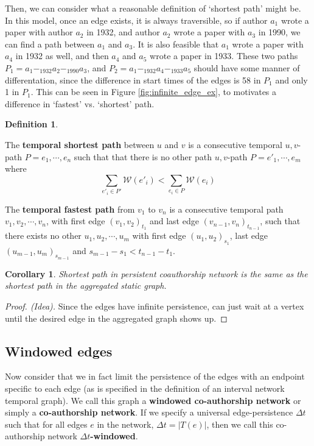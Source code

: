\documentclass{article}
\newtheorem{cor}[thm]{Corollary}
\theoremstyle{definition}
\newtheorem{defn}[thm]{Definition}
\numberwithin{thm}{subsection}
\newcommand{\W}{\mathcal{W}}
\begin{document}
Then, we can consider what a reasonable definition of `shortest path' might be.
In this model, once an edge exists, it is always traversible, so if author
$a_1$ wrote a paper with author $a_2$ in 1932, and author $a_2$ wrote a paper with
$a_3$ in 1990, we can find a path between $a_1$ and $a_3$.  It is also feasible
that $a_1$ wrote a paper with $a_4$ in 1932 as well, and then $a_4$ and $a_5$
wrote a paper in 1933. These two paths $P_1 = a_1 -_{1932} a_2 -_{1990} a_3$, and
$P_2 = a_1 -_{1932} a_4 -_{1933} a_5$ should have some manner of differentation,
since the difference in start times of the edges is 58 in $P_1$ and only 1
in $P_1$. This can be seen in Figure \ref{fig:infinite_edge_ex}, to motivates a
difference in `fastest' vs. `shortest' path.


\begin{defn}

  \label{defn:short_fast_path}

  The \textbf{temporal shortest path} between $u$ and $v$ is a consecutive
  temporal $u,v$-path $P = e_1, \cdots, e_n$ such that that there is no other
  path $u,v$-path $P = e'_1, \cdots, e_m$ where
  \[\sum_{e'_i \in P'} \W(e'_i) < \sum_{e_i \in P} \W(e_i) \]

  The \textbf{temporal fastest path} from $v_1$ to $v_n$ is a consecutive
  temporal path $v_1,v_2,\cdots,v_n$, with first edge $(v_1,v_2)_{t_1}$ and last
  edge $(v_{n-1},v_n)_{t_{n-1}}$, such that there exists no other
  $u_1,u_2, \cdots, u_m$ with first edge $(u_1,u_2)_{s_1}$, last edge
  $(u_{m-1},u_m)_{s_{m-1}}$ and $s_{m-1} - s_1 < t_{n-1} - t_{1}$.
\end{defn}


\begin{cor}
  Shortest path in persistent coauthorship network is the same as the shortest
  path in the aggregated static graph.
\end{cor}

\begin{proof}[Proof. (Idea)]
  Since the edges have infinite persistence, can just wait at a vertex until
  the desired edge in the aggregated graph shows up.
\end{proof}


\subsection{Windowed edges}

Now consider that we in fact limit the persistence of the edges with an endpoint
specific to each edge (as is specified in the definition of an interval network
temporal graph). We call this graph a \textbf{windowed co-authorship network} or
simply a \textbf{co-authorship network}. If we specify a universal
edge-persistence $\Delta t$ such that for all edges $e$ in the
network, $\Delta t = |T(e)|$, then we call this co-authorship network
\textbf{$\Delta t$-windowed}.
\end{document}
